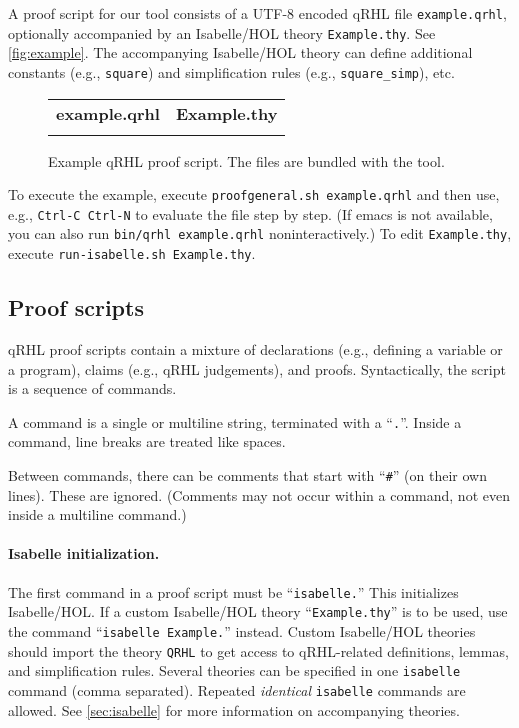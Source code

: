 \documentclass{article}
\makeatletter
\newcommand\toolidx[1]{\index{#1@\textttOLD{#1} (tool command)}}
\makeatother
\begin{document}
A proof script for our tool consists of a UTF-8 encoded qRHL file
\texttt{example.qrhl}, optionally accompanied by an Isabelle/HOL
theory \texttt{Example.thy}. See \autoref{fig:example}. The
accompanying Isabelle/HOL theory can define additional constants
(e.g., \texttt{square}) and simplification rules (e.g.,
\texttt{square\_simp}), etc.  

\begin{figure}[t]\centering
  \lstset{aboveskip=0pt,belowskip=0pt,frame=single}
  \centering
  \begin{tabular}{p{.45\hsize}p{.45\hsize}}
    \textbf{example.qrhl}
    &
      \textbf{Example.thy}
    \\[-5pt]
    
    &
      
  \end{tabular}
  \vspace*{-5mm}
  \caption{Example qRHL proof script. The files are bundled with the tool.}
  \label{fig:example}
\end{figure}

To execute the example, execute \texttt{proofgeneral.sh
  example.qrhl} and then use, e.g., \texttt{Ctrl-C Ctrl-N} to evaluate
the file step by step. (If emacs is not available, you can also run
\texttt{bin/qrhl example.qrhl} noninteractively.) To edit
\texttt{Example.thy}, execute \texttt{run-isabelle.sh Example.thy}.

\subsection{Proof scripts}
\label{sec:tool.proofscripts}

qRHL proof scripts contain a mixture of declarations (e.g., defining a
variable or a program), claims (e.g., qRHL judgements), and proofs.
Syntactically, the script is a sequence of commands.

A command is a single or multiline string, terminated with a
``\texttt{.}''.
Inside a command, line breaks are treated like spaces.

Between commands, there can be comments that start with ``\texttt{\#}'' (on
their own lines). These are ignored. (Comments may not occur within a
command, not even inside a multiline command.)

\paragraph{Isabelle initialization.} The first command in a proof
script must be ``\texttt{isabelle.}''\toolidx{isabelle} This
initializes Isabelle/HOL. If a
custom Isabelle/HOL theory ``\texttt{Example.thy}'' is to be used, use
the command ``\texttt{isabelle Example.}'' instead. Custom
Isabelle/HOL theories should import the theory \texttt{QRHL} to get
access to qRHL-related definitions, lemmas, and simplification rules.
Several theories can be specified in one \texttt{isabelle} command (comma separated). 
Repeated \emph{identical} \texttt{isabelle} commands are allowed.
See \autoref{sec:isabelle} for more information on accompanying theories.
\end{document}
